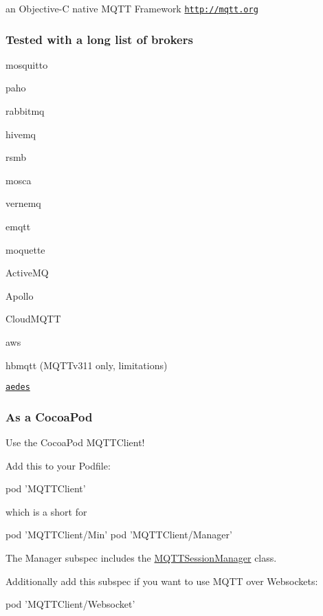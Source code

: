 an Objective-\/C native M\+Q\+TT Framework \href{http://mqtt.org}{\tt http\+://mqtt.\+org}

\subsubsection*{Tested with a long list of brokers}


\begin{DoxyItemize}
\item mosquitto
\item paho
\item rabbitmq
\item hivemq
\item rsmb
\item mosca
\item vernemq
\item emqtt
\item moquette
\item Active\+MQ
\item Apollo
\item Cloud\+M\+Q\+TT
\item aws
\item hbmqtt (M\+Q\+T\+Tv311 only, limitations)
\item \href{https://github.com/mcollina/aedes}{\tt aedes}
\end{DoxyItemize}

\subsubsection*{As a Cocoa\+Pod}

Use the Cocoa\+Pod M\+Q\+T\+T\+Client!

Add this to your Podfile\+:


\begin{DoxyCode}
pod 'MQTTClient'
\end{DoxyCode}
 which is a short for 
\begin{DoxyCode}
pod 'MQTTClient/Min'
pod 'MQTTClient/Manager'
\end{DoxyCode}


The Manager subspec includes the \hyperlink{interface_m_q_t_t_session_manager}{M\+Q\+T\+T\+Session\+Manager} class.

Additionally add this subspec if you want to use M\+Q\+TT over Websockets\+:


\begin{DoxyCode}
pod 'MQTTClient/Websocket'
\end{DoxyCode}


